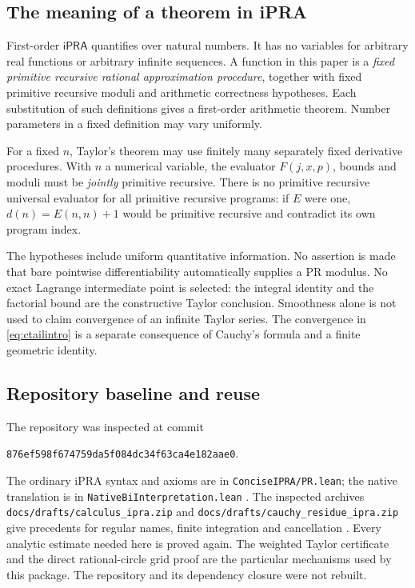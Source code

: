 \documentclass[11pt]{article}
\theoremstyle{definition}
\newcommand{\ipra}{\mathsf{iPRA}}
\newcommand{\code}[1]{\texttt{#1}}
\begin{document}
\subsection{The meaning of a theorem in iPRA}

First-order \(\ipra\) quantifies over natural numbers. It has no variables
for arbitrary real functions or arbitrary infinite sequences. A function
in this paper is a \emph{fixed primitive recursive rational approximation
procedure}, together with fixed primitive recursive moduli and arithmetic
correctness hypotheses. Each substitution of such definitions gives a
first-order arithmetic theorem. Number parameters in a fixed definition
may vary uniformly.

For a fixed \(n\), Taylor's theorem may use finitely many separately fixed
derivative procedures. With \(n\) a numerical variable, the evaluator
\(F(j,x,p)\), bounds and moduli must be \emph{jointly} primitive recursive.
There is no primitive recursive universal evaluator for all primitive
recursive programs: if \(E\) were one, \(d(n)=E(n,n)+1\) would be primitive
recursive and contradict its own program index.

The hypotheses include uniform quantitative information. No assertion is
made that bare pointwise differentiability automatically supplies a PR
modulus. No exact Lagrange intermediate point is selected: the integral
identity and the factorial bound are the constructive Taylor conclusion.
Smoothness alone is not used to claim convergence of an infinite Taylor
series. The convergence in \eqref{eq:ctailintro} is a separate consequence
of Cauchy's formula and a finite geometric identity.

\subsection{Repository baseline and reuse}

The repository was inspected at commit
\begin{center}
\code{876ef598f674759da5f084dc34f63ca4e182aae0}.
\end{center}
The ordinary iPRA syntax and axioms are in \code{ConciseIPRA/PR.lean};
the native translation is in \code{NativeBiInterpretation.lean}
\cite{prsource,nativesource}. The inspected archives
\code{docs/drafts/calculus\_ipra.zip} and
\code{docs/drafts/cauchy\_residue\_ipra.zip} give precedents for regular
names, finite integration and cancellation \cite{calculusdraft,cauchydraft}.
Every analytic estimate needed here is proved again. The weighted Taylor
certificate and the direct rational-circle grid proof are the particular
mechanisms used by this package. The repository and its dependency
closure were not rebuilt.
\end{document}
